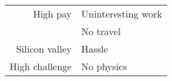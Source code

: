 \documentclass[final,dvips]{foils}
\begin{document}
\rotatefoilhead{%
\Large\textcolor{blue}{\hfill Computer industry programmer \hfill}}\vspace{-0.5in}\large
\begin{table}
\begin{center}
\begin{tabular}[c]{ r l }
High pay & Uninteresting work \\[1.0ex]
& No travel \\[1.0ex]
Silicon valley & Hassle \\[1.0ex]
High challenge & No physics \\[1.0ex]
\end{tabular}
\end{center}
\end{table}
\end{document}
